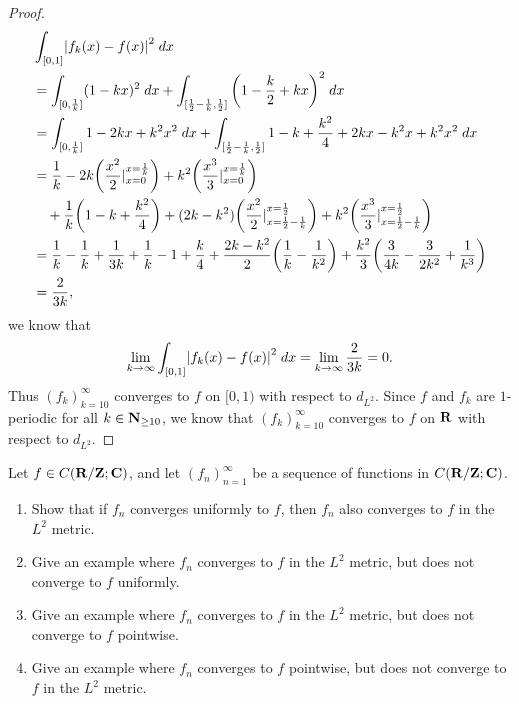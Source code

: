 \begin{proof}
\begin{align*}
     & \int_{[0, 1]} \abs{f_k(x) - f(x)}^2 \; dx                                                                                                                                                                                          \\
     & = \int_{[0, \frac{1}{k}]} (1 - kx)^2 \; dx + \int_{[\frac{1}{2} - \frac{1}{k}, \frac{1}{2}]} \bigg(1 - \frac{k}{2} + kx\bigg)^2 \; dx                                                                                              \\
     & = \int_{[0, \frac{1}{k}]} 1 - 2kx + k^2 x^2 \; dx + \int_{[\frac{1}{2} - \frac{1}{k}, \frac{1}{2}]} 1 - k + \frac{k^2}{4} + 2kx - k^2 x + k^2 x^2 \; dx                                                                            \\
     & = \frac{1}{k} - 2k \bigg(\frac{x^2}{2}|_{x = 0}^{x = \frac{1}{k}}\bigg) + k^2 \bigg(\frac{x^3}{3}|_{x = 0}^{x = \frac{1}{k}}\bigg)                                                                                                 \\
     & \quad + \frac{1}{k} \bigg(1 - k + \frac{k^2}{4}\bigg) + (2k - k^2) \bigg(\frac{x^2}{2}|_{x = \frac{1}{2} - \frac{1}{k}}^{x = \frac{1}{2}}\bigg) + k^2 \bigg(\frac{x^3}{3}|_{x = \frac{1}{2} - \frac{1}{k}}^{x = \frac{1}{2}}\bigg) \\
     & = \frac{1}{k} - \frac{1}{k} + \frac{1}{3k} + \frac{1}{k} - 1 + \frac{k}{4} + \frac{2k - k^2}{2} \bigg(\frac{1}{k} - \frac{1}{k^2}\bigg) + \frac{k^2}{3} \bigg(\frac{3}{4k} - \frac{3}{2k^2} + \frac{1}{k^3}\bigg)                  \\
     & = \frac{2}{3k},
  \end{align*}
  we know that
  \[
    \lim_{k \to \infty} \int_{[0, 1]} \abs{f_k(x) - f(x)}^2 \; dx = \lim_{k \to \infty} \frac{2}{3k} = 0.
  \]
  Thus \((f_k)_{k = 10}^\infty\) converges to \(f\) on \([0, 1)\) with respect to \(d_{L^2}\).
  Since \(f\) and \(f_k\) are \(1\)-periodic for all \(k \in \mathbf{N}_{\geq 10}\), we know that \((f_k)_{k = 10}^\infty\) converges to \(f\) on \(\mathbf{R}\) with respect to \(d_{L^2}\).
\end{proof}

\begin{exercise}\label{ex 5.2.6}
  Let \(f \in C(\mathbf{R} / \mathbf{Z} ; \mathbf{C})\), and let \((f_n)_{n = 1}^\infty\) be a sequence of functions in \(C(\mathbf{R} / \mathbf{Z} ; \mathbf{C})\).
  \begin{enumerate}
    \item Show that if \(f_n\) converges uniformly to \(f\), then \(f_n\) also converges to \(f\) in the \(L^2\) metric.
    \item Give an example where \(f_n\) converges to \(f\) in the \(L^2\) metric, but does not converge to \(f\) uniformly.
    \item Give an example where \(f_n\) converges to \(f\) in the \(L^2\) metric, but does not converge to \(f\) pointwise.
    \item Give an example where \(f_n\) converges to \(f\) pointwise, but does not converge to \(f\) in the \(L^2\) metric.
  \end{enumerate}
\end{exercise}

